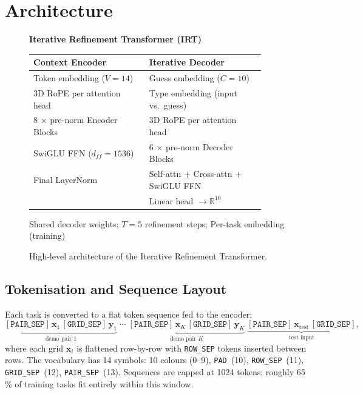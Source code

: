 \documentclass[11pt,a4paper]{article}
\begin{document}
\section{Architecture}
\label{sec:arch}

\begin{figure}[H]
\centering
\begin{minipage}{0.88\linewidth}
\small
\begin{center}
\textbf{Iterative Refinement Transformer (IRT)}
\end{center}
\vspace{0.5em}
\begin{tabular}{@{}p{0.45\linewidth}p{0.45\linewidth}@{}}
\toprule
\textbf{Context Encoder} & \textbf{Iterative Decoder} \\
\midrule
Token embedding ($V{=}14$) & Guess embedding ($C{=}10$)\\
3D RoPE per attention head & Type embedding (input vs.\ guess)\\
8 $\times$ pre-norm Encoder Blocks & 3D RoPE per attention head\\
SwiGLU FFN ($d_{ff}{=}1536$) & 6 $\times$ pre-norm Decoder Blocks\\
Final LayerNorm & Self-attn $+$ Cross-attn $+$ SwiGLU FFN\\
& Linear head $\to \mathbb{R}^{10}$\\
\bottomrule
\end{tabular}
\vspace{0.3em}
\begin{center}
Shared decoder weights; $T{=}5$ refinement steps; Per-task embedding (training)
\end{center}
\end{minipage}
\caption{High-level architecture of the Iterative Refinement Transformer.}
\label{fig:arch}
\end{figure}

\subsection{Tokenisation and Sequence Layout}

Each task is converted to a flat token sequence fed to the encoder:
\[
  \underbrace{[\texttt{PAIR\_SEP}]\,\mathbf{x}_1\,[\texttt{GRID\_SEP}]\,\mathbf{y}_1}_{\text{demo pair 1}}
  \;\cdots\;
  \underbrace{[\texttt{PAIR\_SEP}]\,\mathbf{x}_K\,[\texttt{GRID\_SEP}]\,\mathbf{y}_K}_{\text{demo pair }K}
  \;\underbrace{[\texttt{PAIR\_SEP}]\,\mathbf{x}_{\text{test}}\,[\texttt{GRID\_SEP}]}_{\text{test input}},
\]
where each grid $\mathbf{x}_i$ is flattened row-by-row with \texttt{ROW\_SEP} tokens
inserted between rows.  The vocabulary has 14 symbols:
10 colours (0--9), \texttt{PAD}~(10), \texttt{ROW\_SEP}~(11), \texttt{GRID\_SEP}~(12),
\texttt{PAIR\_SEP}~(13).  Sequences are capped at 1024 tokens; roughly 65\,\% of
training tasks fit entirely within this window.
\end{document}
